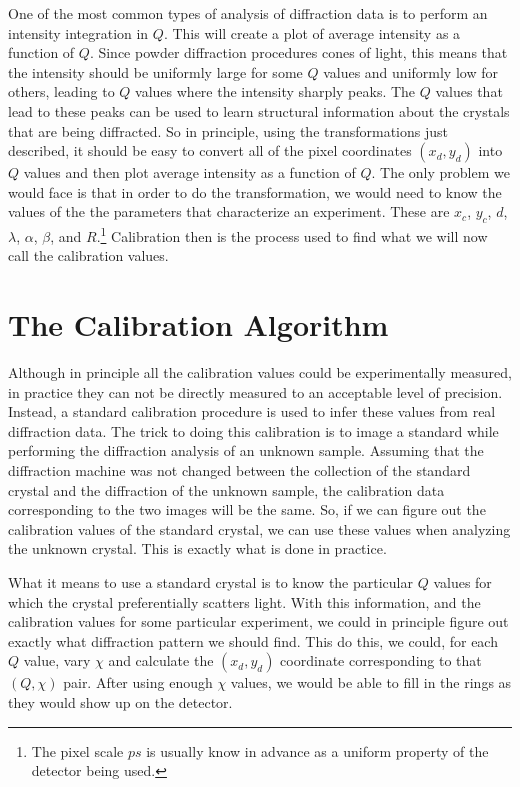 One of the most common types of analysis of diffraction data
is to perform an intensity integration in $Q$. This will 
create a plot of average intensity as a function of $Q$.
Since powder diffraction procedures cones of light, this means
that the intensity should be uniformly large for some $Q$
values and uniformly low for others, leading to $Q$ values
where the intensity sharply peaks. The $Q$ values that lead 
to these peaks can be used to learn structural information
about the crystals that are being diffracted. So in principle,
using the transformations just described, it should be easy
to convert all of the pixel coordinates $(x_d,y_d)$ into
$Q$ values and then plot average intensity as a function of
$Q$. The only problem we would face is that in order to do
the transformation, we would need to know the values of the
the parameters that characterize an experiment. These are
\index{$\alpha$}\index{$\beta$}
$x_c$, $y_c$, $d$, $\lambda$, $\alpha$, $\beta$, and 
$R$.\footnote{The pixel scale $ps$ is usually know in advance 
as a uniform property of the detector being used.} Calibration
then is the process used to find what we will now call the
calibration values.

\section{The Calibration Algorithm}\label{cal_algorithm}

Although in principle all the calibration values could be
experimentally measured, in practice they can not be
directly measured to an acceptable level of precision. 
Instead, a standard calibration procedure is used to 
infer these values from real diffraction data. The 
trick to doing this calibration is to image a standard
while performing the diffraction analysis of an 
unknown sample. Assuming that the diffraction machine
was not changed between the collection of the 
standard crystal and the diffraction of the unknown sample, 
the calibration data corresponding to the two 
images will be the same. So, if we can figure out the
calibration values of the standard crystal, we can
use these values when analyzing the unknown crystal.
This is exactly what is done in practice.

What it means to use a standard crystal is to know the
particular $Q$ values for which the crystal preferentially
scatters light. With this information, and the 
calibration values for some particular experiment,
we could in principle figure out exactly what diffraction
pattern we should find. This do this, we could, for
each $Q$ value, vary $\chi$ and calculate the 
$(x_d,y_d)$ coordinate corresponding to that $(Q,\chi)$
pair. After using enough $\chi$ values, we would be 
able to fill in the rings as they would show up on 
the detector.

